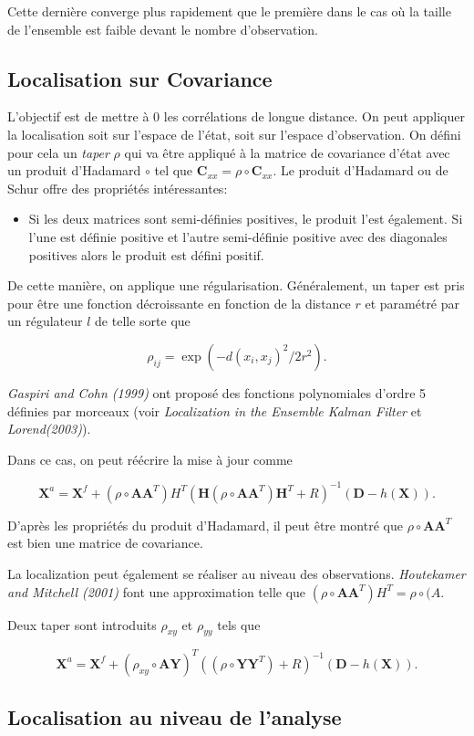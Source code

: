 \documentclass{article}
\newcommand{\bA}{\bm{A}}
\newcommand{\bX}{\bm{X}}
\newcommand{\bD}{\bm{D}}
\newcommand{\bH}{\bm{H}}
\newcommand{\bY}{\bm{Y}}
\newcommand{\bC}{\bm{C}}
\begin{document}
Cette dernière converge plus rapidement que le première dans le cas où la taille de l'ensemble est faible devant le nombre d'observation.

\subsection{Localisation sur Covariance}

L'objectif est de mettre à 0 les corrélations de longue distance.
On peut appliquer la localisation soit sur l'espace de l'état, soit sur l'espace d'observation. On défini pour cela un \textit{taper} $\rho$ qui va être appliqué à la matrice de covariance d'état avec un produit d'Hadamard $\circ$ tel que $\bC_{xx} = \rho \circ \bC_{xx}$.
Le produit d'Hadamard ou de Schur offre des propriétés intéressantes:
\begin{itemize}
    \item Si les deux matrices sont semi-définies positives, le produit l'est également. Si l'une est définie positive et l'autre semi-définie positive avec des diagonales positives alors le produit est défini positif.
\end{itemize}

De cette manière, on applique une régularisation. Généralement, un taper est pris pour être une fonction décroissante en fonction de la distance $r$ et paramétré par un régulateur $l$ de telle sorte que

\[
    \rho_{ij} = \exp(-d(x_i, x_j)^2/2r^2).
\]

\textit{Gaspiri and Cohn (1999)} ont proposé des fonctions polynomiales d'ordre 5 définies par morceaux (voir \textit{Localization in the Ensemble Kalman Filter} et \textit{Lorend(2003)}).

Dans ce cas, on peut réécrire la mise à jour  comme

\[
    \bX^a = \bX^f + (\rho \circ \bA\bA^T) H^T (\bH (\rho \circ \bA\bA^T) \bH^T + R)^{-1}(\bD - h(\bX)).
\]

D'après les propriétés du produit d'Hadamard, il peut être montré que $\rho \circ \bA\bA^T$ est bien une matrice de covariance.

La localization peut également se réaliser au niveau des observations. \textit{Houtekamer and Mitchell (2001)} font une approximation telle que $(\rho \circ \bA\bA^T)H^T = \rho \circ (A$.

Deux taper sont introduits $\rho_{xy}$ et $\rho_{yy}$ tels que

\[
    \bX^a = \bX^f + (\rho_{xy} \circ \bA\bY)^T ((\rho \circ \bY\bY^T) + R)^{-1}(\bD - h(\bX)).
\]

\subsection{Localisation au niveau de l'analyse}
\end{document}
